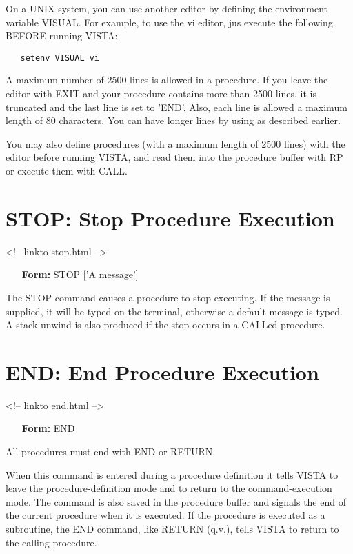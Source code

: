 On a UNIX system, you can use another editor by defining the environment
variable VISUAL. For example, to use the vi editor, jus execute the
following BEFORE running VISTA:
\begin{verbatim}
   setenv VISUAL vi
\end{verbatim}
A maximum number of 2500 lines is allowed in a procedure.  If you leave the
editor with EXIT and your procedure contains more than 2500 lines, it is
truncated and the last line is set to 'END'.  Also, each line is allowed a
maximum length of 80 characters. You can have longer lines by using
 as described
earlier.

You may also define procedures (with a maximum length of 2500 lines) with
the editor before running VISTA, and read them into the procedure buffer
with RP or execute them with CALL.

\section{STOP: Stop Procedure Execution}
\begin{rawhtml}
<!-- linkto stop.html -->
\end{rawhtml}

\begin{itemize}
  \item[\textbf{Form: } STOP {['A message']}\hfill]{}
\end{itemize}
The STOP command causes a procedure to stop executing.  If the message is
supplied, it will be typed on the terminal, otherwise a default message is
typed.  A stack unwind is also produced if the stop occurs in a CALLed
procedure.

\section{END: End Procedure Execution}
\begin{rawhtml}
<!-- linkto end.html -->
\end{rawhtml}

\begin{itemize} 
  \item[\textbf{Form: } END\hfill]{}
\end{itemize}

All procedures must end with END or RETURN.

When this command is entered during a procedure definition it tells VISTA
to leave the procedure-definition mode and to return to the
command-execution mode.  The command is also saved in the procedure buffer
and signals the end of the current procedure when it is executed.  If the
procedure is executed as a subroutine, the END command, like RETURN (q.v.),
tells VISTA to return to the calling procedure.


